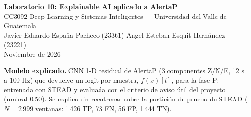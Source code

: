 \documentclass[10pt,letterpaper]{article}
\begin{document}
\begin{center}
{\Large\textbf{Laboratorio 10: Explainable AI aplicado a AlertaP}}\\[2pt]
CC3092 Deep Learning y Sistemas Inteligentes --- Universidad del Valle de Guatemala\\
Javier Eduardo España Pacheco (23361) \quad Angel Esteban Esquit Hernández (23221)\\
Noviembre de 2026
\end{center}

\textbf{Modelo explicado.} CNN 1-D residual de AlertaP (3 componentes Z/N/E, 12 s a 100 Hz) que devuelve
un logit por muestra, $f(x)[t]$, para la fase P; entrenada con STEAD y evaluada con el criterio de aviso útil del
proyecto (umbral 0.50). Se explica sin reentrenar sobre la partición de prueba de STEAD ($N=2\,999$ ventanas: 1\,426 TP, 73 FN, 56 FP, 1\,444 TN).
\end{document}
